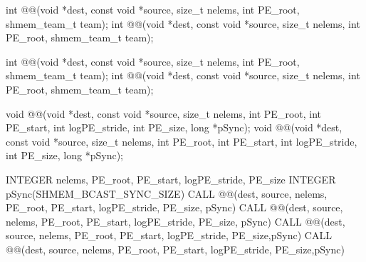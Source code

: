 
\begin{apidefinition}

{\color{Green}
\begin{C11synopsis}
int @@(void *dest, const void *source, size_t nelems, int PE_root, shmem_team_t team);
int @@(void *dest, const void *source, size_t nelems, int PE_root, shmem_team_t team);
\end{C11synopsis}
}

\begin{Csynopsis}
\end{Csynopsis}
{\color{Green}
\begin{CsynopsisCol}
int @@(void *dest, const void *source, size_t nelems, int PE_root, shmem_team_t team);
int @@(void *dest, const void *source, size_t nelems, int PE_root, shmem_team_t team);
\end{CsynopsisCol}
}
\begin{DeprecateBlock}
\begin{CsynopsisCol}
void @@(void *dest, const void *source, size_t nelems, int PE_root, int PE_start, int logPE_stride, int PE_size, long *pSync);
void @@(void *dest, const void *source, size_t nelems, int PE_root, int PE_start, int logPE_stride, int PE_size, long *pSync);
\end{CsynopsisCol}
\end{DeprecateBlock}

\begin{Fsynopsis}
INTEGER nelems, PE_root, PE_start, logPE_stride, PE_size
INTEGER pSync(SHMEM_BCAST_SYNC_SIZE)
CALL @@(dest, source, nelems, PE_root, PE_start, logPE_stride, PE_size, pSync)
CALL @@(dest, source, nelems, PE_root, PE_start, logPE_stride, PE_size, pSync)
CALL @@(dest, source, nelems, PE_root, PE_start, logPE_stride, PE_size,pSync)
CALL @@(dest, source, nelems, PE_root, PE_start, logPE_stride, PE_size,pSync)
\end{Fsynopsis}
 
\begin{apiarguments}


\end{apiarguments}
\end{apidefinition}
